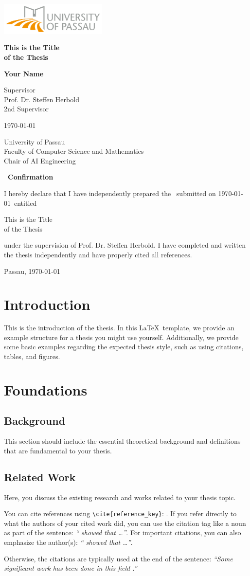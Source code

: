 \documentclass[a4paper,12pt,notitlepage,twoside,openright]{report}
\newcommand{\titlepageformat}{
    \begin{titlepage}
        \newgeometry{left=1in, right=1in, top=1in, bottom=1in} %
        \begin{center}
            \vspace{0.5in}  
         
            \includegraphics[width=0.4\textwidth]{img/logo.png}
            
            \vspace*{0.4in}
    
            \LARGE \thesistype
            \vspace{0.8in}
            
            \Huge \textbf{\thesistitle}
            
            \vspace{0.4in}
            
            \LARGE\textbf{\authorname}
            
            \vspace{1.5in}
            
           \large Supervisor \\
            \LARGE \supervisorname\\
            \supervisornameII\\
            \supervisornameIII
            
            \vfill
            
            \large \submissiondate
            
            \vspace{0.5in}
            
            \universityname \\
            \facultyname \\
            \departmentname
        \end{center}
    \end{titlepage}
}
\newcommand{\confirmation}{
        \cleardoublepage
       \begin{flushleft}
            \textbf{\LARGE\ Confirmation}\\\vspace{0.2in}
           
            I hereby declare that I have independently prepared the \thesistype\ submitted on \submissiondate\ entitled
            \begin{center}
                \thesistitle
            \end{center}
            under the supervision of \supervisorname. I have completed and written the thesis independently and have properly cited all references.
        \end{flushleft}
        \vspace{0.5in}
        Passau, \submissiondate
        \cleardoublepage
}
\newcommand{\thesistitle}{This is the Title \\of the Thesis}
\newcommand{\authorname}{Your Name}
\newcommand{\supervisorname}{Prof. Dr. Steffen Herbold}
\newcommand{\supervisornameII}{2nd Supervisor} %
\newcommand{\supervisornameIII}{} %
\newcommand{\submissiondate}{\today}
\newcommand{\universityname}{University of Passau}
\newcommand{\facultyname}{Faculty of Computer Science and Mathematics}
\newcommand{\departmentname}{Chair of AI Engineering}
\begin{document}

\titlepageformat

\confirmation

\begin{abstract}
    This is the abstract of the thesis. It provides a brief summary of the research, including the main findings and conclusions.
\end{abstract}

\tableofcontents
\cleardoublepage
{}

\chapter{Introduction}\label{chp:introduction}
This is the introduction of the thesis. In this \LaTeX\ template, we provide an example structure for a thesis you might use yourself. 
Additionally, we provide some basic examples regarding the expected thesis style, such as using citations, tables, and figures. 


\chapter{Foundations}

\section{Background}\label{sec:background}

This section should include the essential theoretical background and definitions that are fundamental to your thesis.

\section{Related Work}

Here, you discuss the existing research and works related to your thesis topic.

You can cite references using \texttt{\textbackslash cite\{reference\_key\}}: \cite{bert}. If you refer directly to what the authors of your cited work did, you can use the citation tag like a noun as part of the sentence: \emph{“\cite{bert} showed that \dots”}. For important citations, you can also emphasize the author(s): \emph{“\citeauthor{bert} \cite{bert} showed that \dots”}.

Otherwise, the citations are typically used at the end of the sentence: \emph{“Some significant work has been done in this field \cite*{bert}.”}
\end{document}
